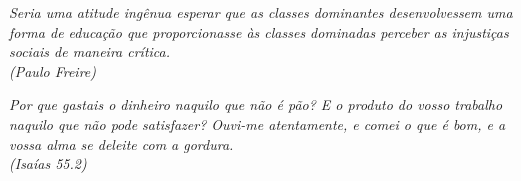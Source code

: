 



\newpage
\begin{epigrafe}
    \vspace*{\fill}
	\begin{flushright}
		\textit{Seria uma atitude ingênua esperar que as classes dominantes desenvolvessem uma forma de educação que proporcionasse às classes dominadas perceber as injustiças sociais de maneira crítica.\\
        (Paulo Freire)}
    \end{flushright}
    \begin{flushright}
        \textit{Por que gastais o dinheiro naquilo que não é pão? E o produto do vosso trabalho naquilo que não pode satisfazer? Ouvi-me atentamente, e comei o que é bom, e a vossa alma se deleite com a gordura.\\
        (Isaías 55.2)}
	\end{flushright}
\end{epigrafe}


